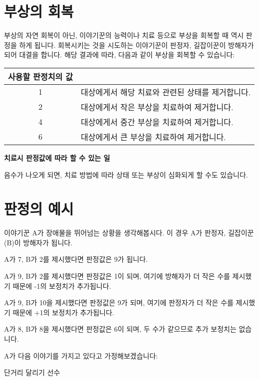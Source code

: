 \documentclass{report}
\begin{document}
	\section*{부상의 회복}
	부상의 자연 회복이 아닌, 이야기꾼의 능력이나 치료 등으로 부상을 회복할 때 역시 판정을 하게 됩니다. 회복시키는 것을 시도하는 이야기꾼이 판정자, 길잡이꾼이 방해자가 되어 대결을 합니다. 해당 결과에 따라, 다음과 같이 부상을 회복할 수 있습니다:
	
	\begin{minipage}{\textwidth}
		\begin{tabularx}{\textwidth}{c|X}
			\hline
			\textbf{사용할 판정치의 값} & \makecell{\centering\textbf{할 수 있는 일}} \\ \hline \hline
			1 & 대상에게서 해당 치료와 관련된 상태를 제거합니다. \\ \hline
			2 & 대상에게서 작은 부상을 치료하여 제거합니다.\\ \hline
			4 & 대상에게서 중간 부상을 치료하여 제거합니다. \\ \hline
			6 & 대상에게서 큰 부상을 치료하여 제거합니다. \\ \hline
		\end{tabularx}
		
		\smallskip
		
		\begin{tightcenter}
			\textbf{치료시 판정값에 따라 할 수 있는 일}
		\end{tightcenter}
	\end{minipage}
	
	음수가 나오게 되면, 치료 방법에 따라 상태 또는 부상이 심화되게 할 수도 있습니다.
	
	\section*{판정의 예시}
	이야기꾼 A가 장애물을 뛰어넘는 상황을 생각해봅시다. 이 경우 A가 판정자, 길잡이꾼(B)이 방해자가 됩니다.
	
	A가 7, B가 2를 제시했다면 판정값은 9가 됩니다.
	
	A가 9, B가 2를 제시했다면 판정값은 1이 되며, 여기에 방해자가 더 작은 수를 제시했기 때문에 -1의 보정치가 추가됩니다.
	
	A가 9, B가 10을 제시했다면 판정값은 9가 되며, 여기에 판정자가 더 작은 수를 제시했기 때문에 +1의 보정치가 추가됩니다.
	
	A가 8, B가 8을 제시했다면 판정값은 6이 되며, 두 수가 같으므로 추가 보정치는 없습니다.
	
	A가 다음 이야기를 가지고 있다고 가정해보겠습니다:
	\begin{lite}[runner]{단거리 달리기 선수}
	\end{lite}
	
\end{document}
